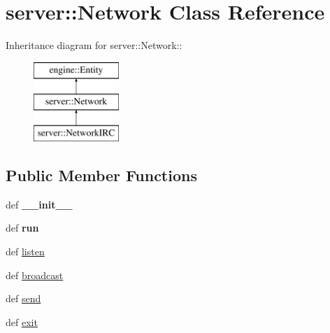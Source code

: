 \hypertarget{classserver_1_1Network}{
\section{server::Network Class Reference}
\label{classserver_1_1Network}
}
Inheritance diagram for server::Network::\begin{figure}[H]
\begin{center}
\leavevmode
\includegraphics[height=3cm]{classserver_1_1Network}
\end{center}
\end{figure}
\subsection*{Public Member Functions}
\begin{DoxyCompactItemize}
\item 
\hypertarget{classserver_1_1Network_ab05d0277f8db59d2aa4ab24c8ecc5df3}{
def {\bfseries \_\-\_\-init\_\-\_\-}}
\label{classserver_1_1Network_ab05d0277f8db59d2aa4ab24c8ecc5df3}

\item 
\hypertarget{classserver_1_1Network_a0883a7b2371147208d265c0ea682c890}{
def {\bfseries run}}
\label{classserver_1_1Network_a0883a7b2371147208d265c0ea682c890}

\item 
def \hyperlink{classserver_1_1Network_a981b8652a76e0bba27263690fcdf9a62}{listen}
\item 
def \hyperlink{classserver_1_1Network_acc3f7a604bfde9cbafb300b693593993}{broadcast}
\item 
def \hyperlink{classserver_1_1Network_ab10936565ca90ef460d5497ac40a4618}{send}
\item 
def \hyperlink{classserver_1_1Network_a638b4611a8e77862e8b974848dc775e5}{exit}
\end{DoxyCompactItemize}
